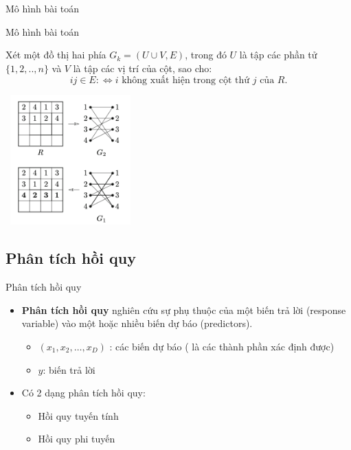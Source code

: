 \documentclass[notheorems,hyperref={bookmarks=true}]{beamer}
\theoremstyle{plain}
\begin{document}
\begin{footnotesize}
\begin{frame}{Mô hình bài toán}
\end{frame}

\begin{frame}{Mô hình bài toán}
\begin{flushleft}
Xét một đồ thị hai phía $G_k = (U \cup V,E)$, trong đó $U$ là tập các phần tử $\{1,2,..,n\}$ và $V$ là tập các vị trí của cột, sao cho:
\begin{equation*}
ij \in E :\Leftrightarrow i \textrm{ không xuất hiện trong cột thứ } j \textrm{ của } R.
\end{equation*}
\end{flushleft}

\begin{flushright}
	\includegraphics[width=5cm,height=5cm]{ex3}
\end{flushright}

\end{frame}


\subsection{Phân tích hồi quy}
\begin{frame}{Phân tích hồi quy}
\begin{itemize}
    \item \textbf{Phân tích hồi quy} nghiên cứu sự phụ thuộc của một biến trả lời
(response variable) vào một hoặc nhiều biến dự báo (predictors).
\begin{itemize}
    \item $(x_1, x_2,\dots, x_D)$ : các biến dự báo ( là các thành phần xác định được)
    \item $y$: biến trả lời
\end{itemize}
\item Có 2 dạng phân tích hồi quy:
\begin{itemize}
    \item Hồi quy tuyến tính
    \item Hồi quy phi tuyến
\end{itemize}
\end{itemize}
    

\end{frame}
\end{footnotesize}
\end{document}
